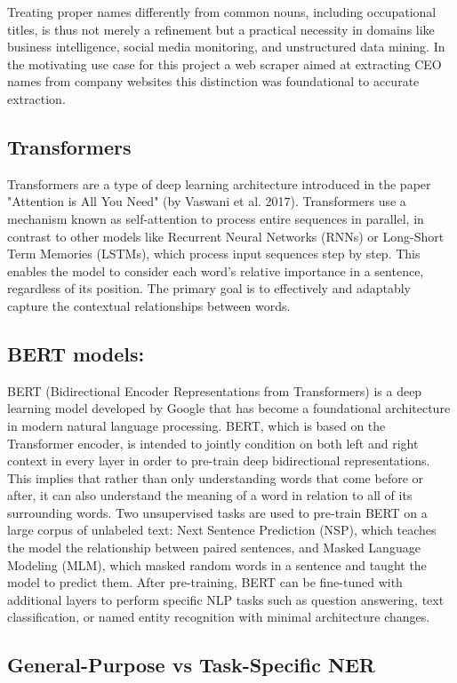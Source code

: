 \documentclass[a4paper]{usiinfbachelorproject}
\begin{document}
Treating proper names differently from common nouns, including occupational titles, is thus not merely a refinement but a practical necessity in domains like business intelligence, social media monitoring, and unstructured data mining. In the motivating use case for this project a web scraper aimed at extracting CEO names from company websites this distinction was foundational to accurate extraction.
\subsection{Transformers}
Transformers are a type of deep learning architecture introduced in the paper "Attention is All You Need" \cite{vaswani2023attentionneed} (by Vaswani et al. 2017). Transformers use a mechanism known as self-attention to process entire sequences in parallel, in contrast to other models like Recurrent Neural Networks (RNNs) or Long-Short Term Memories (LSTMs), which process input sequences step by step. This enables the model to consider each word's relative importance in a sentence, regardless of its position. The primary goal is to effectively and adaptably capture the contextual relationships between words.

\subsection{BERT models:}
BERT (Bidirectional Encoder Representations from Transformers) is a deep learning model developed by Google\cite{devlin2019bertpretrainingdeepbidirectional} that has become a foundational architecture in modern natural language processing. BERT, which is based on the Transformer encoder, is intended to jointly condition on both left and right context in every layer in order to pre-train deep bidirectional representations. This implies that rather than only understanding words that come before or after, it can also understand the meaning of a word in relation to all of its surrounding words. Two unsupervised tasks are used to pre-train BERT on a large corpus of unlabeled text: Next Sentence Prediction (NSP), which teaches the model the relationship between paired sentences, and Masked Language Modeling (MLM), which masked random words in a sentence and taught the model to predict them. After pre-training, BERT can be fine-tuned with additional layers to perform specific NLP tasks such as question answering, text classification, or named entity recognition with minimal architecture changes.

\subsection{General-Purpose vs Task-Specific NER}
\end{document}
